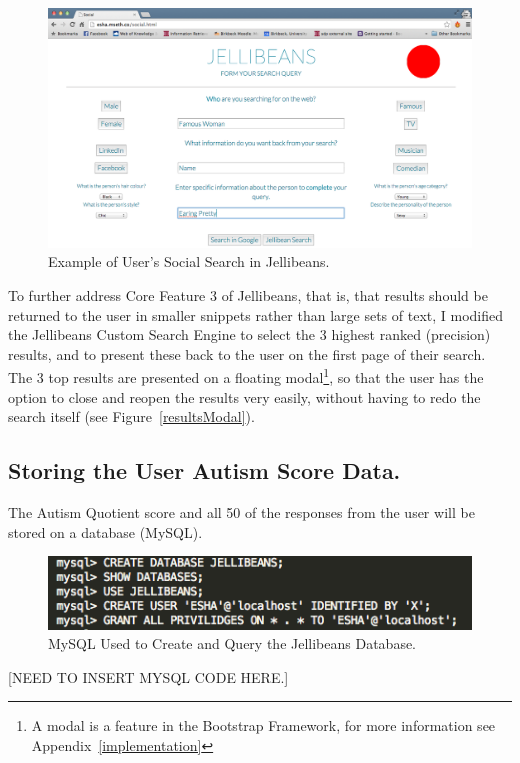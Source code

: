 \documentclass[a4paper, 11pt]{article}
\begin{document}
\begin{figure}[H]
\begin{center}
\includegraphics[scale=0.3]{SocialCompleted}
\caption{Example of User's Social Search in Jellibeans.}
\label{socialCompleted}
\end{center}
\end{figure}

\vspace{5mm} %
To further address Core Feature 3 of Jellibeans, that is, that results should be returned to the user in smaller snippets rather than large sets of text, I modified the Jellibeans Custom Search Engine to select the 3 highest ranked (precision) results, and to present these back to the user on the first page of their search. The 3 top results are presented on a floating modal\footnote{A modal is a feature in the Bootstrap Framework, for more information see Appendix~\ref{implementation}}, so that the user has the option to close and reopen the results very easily, without having to redo the search itself (see Figure~\ref{resultsModal}).

\subsection{Storing the User Autism Score Data.}

The Autism Quotient score and all 50 of the responses from the user will be stored on a database (MySQL).


\begin{figure}[H]
\begin{center}
\includegraphics[scale=0.8]{mysql}
\caption{MySQL Used to Create and Query the Jellibeans Database.}
\label{mysql}
\end{center}
\end{figure}
[NEED TO INSERT MYSQL CODE HERE.]
\end{document}
